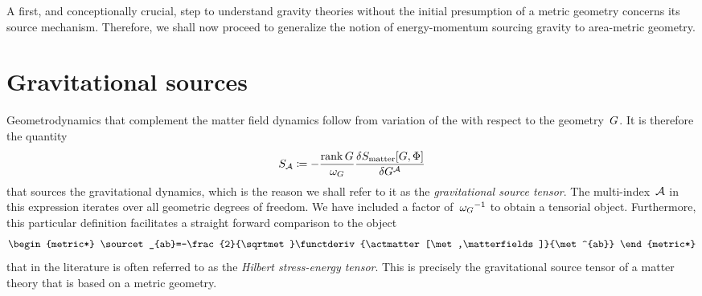 A first, and conceptionally crucial, step to understand gravity theories without the initial presumption of a metric geometry concerns its source mechanism. Therefore, we shall now proceed to generalize the notion of energy-momentum sourcing gravity to area-metric geometry.

\section{Gravitational sources}\label{sec:grav_sources}


Geometrodynamics that complement the matter field dynamics follow from variation of the  with respect to the geometry~$G$. It is therefore the quantity
\begin{equation}\label{eq:sourcet}
	S_{\mathcal{A}}\coloneqq-\frac{\operatorname{rank}{G}}{\omega_G}\frac{\delta S_\mathrm{matter}[G,\Phi]}{\delta G^{\mathcal{A}}}
\end{equation}
that sources the gravitational dynamics, which is the reason we shall refer to it as the \emph{gravitational source tensor}. The multi-index~$\mathcal{A}$ in this expression iterates over all geometric degrees of freedom. We have included a factor of~${\omega_G}^{-1}$ to obtain a tensorial object. Furthermore, this particular definition facilitates a straight forward comparison to the object
\begin{equation}\label{eq:sourcet_met}
	\begin{metric*}
		\sourcet_{ab}=-\frac{2}{\sqrtmet}\functderiv{\actmatter[\met,\matterfields]}{\met^{ab}}
	\end{metric*}
\end{equation}
that in the literature is often referred to as the \emph{Hilbert stress-energy tensor}. This is precisely the gravitational source tensor of a matter theory that is based on a metric geometry.


